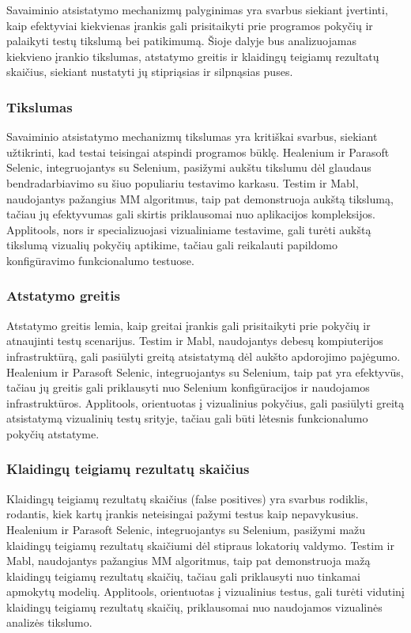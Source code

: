 \documentclass[
]{VUMIFPSkursinis}
\begin{document}
Savaiminio atsistatymo mechanizmų palyginimas yra svarbus siekiant įvertinti, kaip efektyviai kiekvienas įrankis gali prisitaikyti prie programos pokyčių ir palaikyti testų tikslumą bei patikimumą. Šioje dalyje bus analizuojamas kiekvieno įrankio tikslumas, atstatymo greitis ir klaidingų teigiamų rezultatų skaičius, siekiant nustatyti jų stipriąsias ir silpnąsias puses.

\subsubsection{Tikslumas}

Savaiminio atsistatymo mechanizmų tikslumas yra kritiškai svarbus, siekiant užtikrinti, kad testai teisingai atspindi programos būklę. Healenium ir Parasoft Selenic, integruojantys su Selenium, pasižymi aukštu tikslumu dėl glaudaus bendradarbiavimo su šiuo populiariu testavimo karkasu. Testim ir Mabl, naudojantys pažangius MM algoritmus, taip pat demonstruoja aukštą tikslumą, tačiau jų efektyvumas gali skirtis priklausomai nuo aplikacijos kompleksijos. Applitools, nors ir specializuojasi vizualiniame testavime, gali turėti aukštą tikslumą vizualių pokyčių aptikime, tačiau gali reikalauti papildomo konfigūravimo funkcionalumo testuose.

\subsubsection{Atstatymo greitis}

Atstatymo greitis lemia, kaip greitai įrankis gali prisitaikyti prie pokyčių ir atnaujinti testų scenarijus. Testim ir Mabl, naudojantys debesų kompiuterijos infrastruktūrą, gali pasiūlyti greitą atsistatymą dėl aukšto apdorojimo pajėgumo. Healenium ir Parasoft Selenic, integruojantys su Selenium, taip pat yra efektyvūs, tačiau jų greitis gali priklausyti nuo Selenium konfigūracijos ir naudojamos infrastruktūros. Applitools, orientuotas į vizualinius pokyčius, gali pasiūlyti greitą atsistatymą vizualinių testų srityje, tačiau gali būti lėtesnis funkcionalumo pokyčių atstatyme.

\subsubsection{Klaidingų teigiamų rezultatų skaičius}

Klaidingų teigiamų rezultatų skaičius (false positives) yra svarbus rodiklis, rodantis, kiek kartų įrankis neteisingai pažymi testus kaip nepavykusius. Healenium ir Parasoft Selenic, integruojantys su Selenium, pasižymi mažu klaidingų teigiamų rezultatų skaičiumi dėl stipraus lokatorių valdymo. Testim ir Mabl, naudojantys pažangius MM algoritmus, taip pat demonstruoja mažą klaidingų teigiamų rezultatų skaičių, tačiau gali priklausyti nuo tinkamai apmokytų modelių. Applitools, orientuotas į vizualinius testus, gali turėti vidutinį klaidingų teigiamų rezultatų skaičių, priklausomai nuo naudojamos vizualinės analizės tikslumo.
\end{document}
